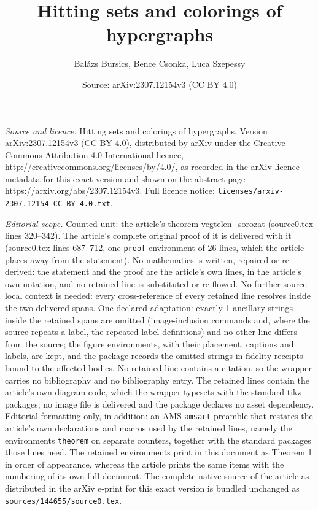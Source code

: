 \documentclass[10pt,a4paper]{amsart}
\title{Hitting sets and colorings of hypergraphs}
\author{Bal\'azs Bursics, Bence Csonka, Luca Szepessy}
\date{Source: arXiv:2307.12154v3 (CC BY 4.0)}
\begin{document}
\maketitle

\noindent\emph{Source and licence.} Hitting sets and colorings of hypergraphs. Version arXiv:2307.12154v3 (CC BY 4.0), distributed by arXiv under the Creative Commons Attribution 4.0 International licence, http://creativecommons.org/licenses/by/4.0/, as recorded in the arXiv licence metadata for this exact version and shown on the abstract page https://arxiv.org/abs/2307.12154v3. Full licence notice: \texttt{licenses/arxiv-2307.12154-CC-BY-4.0.txt}.\par\smallskip

\noindent\textit{Editorial scope.} Counted unit: the article's theorem vegtelen\_sorozat (source0.tex lines 320--342). The article's complete original proof of it is delivered with it (source0.tex lines 687--712, one \texttt{proof} environment of 26 lines, which the article places away from the statement). No mathematics is written, repaired or re-derived: the statement and the proof are the article's own lines, in the article's own notation, and no retained line is substituted or re-flowed.  No further source-local context is needed: every cross-reference of every retained line resolves inside the two delivered spans.  One declared adaptation: exactly 1 ancillary strings inside the retained spans are omitted (image-inclusion commands and, where the source repeats a label, the repeated label definitions) and no other line differs from the source; the figure environments, with their placement, captions and labels, are kept, and the package records the omitted strings in fidelity receipts bound to the affected bodies.  No retained line contains a citation, so the wrapper carries no bibliography and no bibliography entry.  The retained lines contain the article's own diagram code, which the wrapper typesets with the standard tikz packages; no image file is delivered and the package declares no asset dependency.  Editorial formatting only, in addition: an AMS \texttt{amsart} preamble that restates the article's own declarations and macros used by the retained lines, namely the environments \texttt{theorem} on separate counters, together with the standard packages those lines need.  The retained environments print in this document as Theorem 1 in order of appearance, whereas the article prints the same items with the numbering of its own full document.  The complete native source of the article as distributed in the arXiv e-print for this exact version is bundled unchanged as \texttt{sources/144655/source0.tex}.
\end{document}
